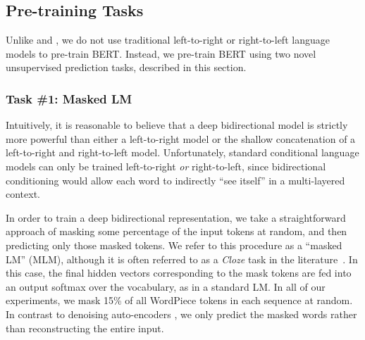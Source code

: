 \subsection{Pre-training Tasks}
\label{sec:pretraining_tasks}

Unlike \citet{peters-etal:2018:_deep} and \citet{radford-etal:2018}, we do not use traditional left-to-right or right-to-left language models to pre-train BERT. Instead, we pre-train BERT using two novel unsupervised prediction tasks, described in this section.

\subsubsection{Task \#1: Masked LM}
Intuitively, it is reasonable to believe that a deep bidirectional model is strictly more powerful than either a left-to-right model or the shallow concatenation of a left-to-right and right-to-left model. Unfortunately, standard conditional language models can only be trained left-to-right {\it or} right-to-left, since bidirectional conditioning would allow each word to indirectly ``see itself'' in a multi-layered context.

In order to train a deep bidirectional representation, we take a straightforward approach of masking some percentage of the input tokens at random, and then predicting only those masked tokens. We refer to this procedure as a ``masked LM'' (MLM), although it is often referred to as a {\it Cloze} task in the literature~\cite{taylor:1953:_cloze}. In this case, the final hidden vectors corresponding to the mask tokens are fed into an output softmax over the vocabulary, as in a standard LM. In all of our experiments, we mask 15\% of all WordPiece tokens in each sequence at random. In contrast to denoising auto-encoders \cite{vincent:2008}, we only predict the masked words rather than reconstructing the entire input.

